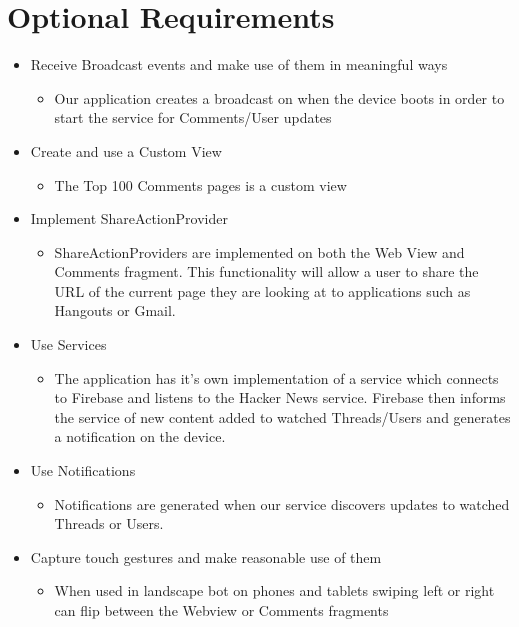 \documentclass[11pt]{article}
\begin{document}
\section*{Optional Requirements}

\begin{itemize}
	\item{Receive Broadcast events and make use of them in meaningful ways}
	\begin{itemize}
		\item{Our application creates a broadcast on when the device boots in order to start the service for Comments/User updates}
	\end{itemize}
	\item{Create and use a Custom View}
	\begin{itemize}
		\item{The Top 100 Comments pages is a custom view}
	\end{itemize}
	\item{Implement ShareActionProvider}
	\begin{itemize}
		\item{ShareActionProviders are implemented on both the Web View and Comments fragment. This functionality will allow a user to share the URL of the current page they are looking at to applications such as Hangouts or Gmail.}
	\end{itemize}
	\item{Use Services}
	\begin{itemize}
		\item{The application has it's own implementation of a service which connects to Firebase and listens to the Hacker News service. Firebase then informs the service of new content added to watched Threads/Users and generates a notification on the device.}
	\end{itemize}
	\item{Use Notifications}
	\begin{itemize}
		\item{Notifications are generated when our service discovers updates to watched Threads or Users.}
	\end{itemize}
	\item{Capture touch gestures and make reasonable use of them}
	\begin{itemize}
		\item{When used in landscape bot on phones and tablets swiping left or right can flip between the Webview or Comments fragments}
	\end{itemize}
\end{itemize}
\pagebreak
\end{document}
